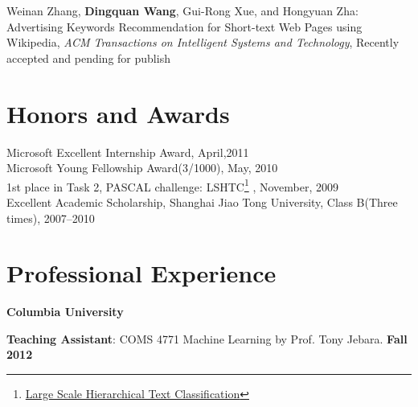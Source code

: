 \documentclass[margin,line]{res}
\newenvironment{list1}{
  \begin{list}{\ding{113}}{%
      \setlength{\itemsep}{0in}
      \setlength{\parsep}{0in} \setlength{\parskip}{0in}
      \setlength{\topsep}{0in} \setlength{\partopsep}{0in} 
      \setlength{\leftmargin}{0.17in}}}{\end{list}}
\begin{document}
\begin{resume}
Weinan Zhang, \textbf{Dingquan Wang}, Gui-Rong Xue, and Hongyuan Zha:
Advertising Keywords Recommendation for Short-text Web Pages using Wikipedia,
\emph{ACM Transactions on Intelligent Systems and Technology}, Recently accepted and pending for publish 

\section{\sc Honors and Awards} 
Microsoft Excellent Internship Award, April,2011 \\
Microsoft Young Fellowship Award(3/1000), May, 2010\\
1st place in Task 2, PASCAL challenge: LSHTC\footnote {\href{http://lshtc.iit.demokritos.gr/}{Large Scale Hierarchical Text Classification}} , November, 2009 \\
Excellent Academic Scholarship, Shanghai Jiao Tong University, Class B(Three times), 2007--2010\\
\vspace*{-2.5mm}

\section{\sc Professional Experience}
{\bf Columbia University}
\begin{list1}
\item[] {\bf Teaching Assistant}: COMS 4771 Machine Learning by Prof. Tony Jebara. \hfill{\bf Fall 2012}
\end{list1}
\vspace*{-.1in}


\end{resume}
\end{document}
